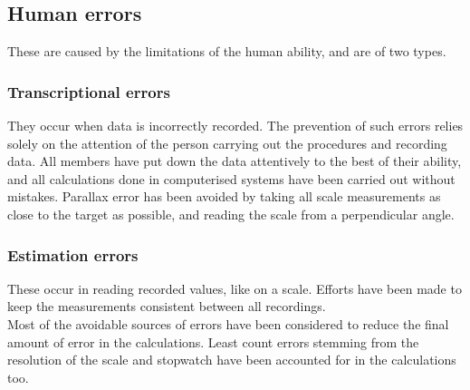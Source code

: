 \documentclass{article}
\begin{document}
\begin{sloppypar}
\subsection{Human errors}
These are caused by the limitations of the human ability, and are of two types.
\subsubsection{Transcriptional errors}
They occur when data is incorrectly recorded. The prevention of such errors relies solely on the attention of the person carrying out the procedures and recording data. All members have put down the data attentively to the best of their ability, and all calculations done in computerised systems have been carried out without mistakes. Parallax error has been avoided by taking all scale measurements as close to the target as possible, and reading the scale from a perpendicular angle.
\subsubsection{Estimation errors}
These occur in reading recorded values, like on a scale. Efforts have been made to keep the measurements consistent between all recordings. \\
\vspace{5mm}
Most of the avoidable sources of errors have been considered to reduce the final amount of error in the calculations. Least count errors stemming from the resolution of the scale and stopwatch have been accounted for in the calculations too.
\end{sloppypar}
\end{document}
